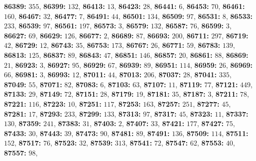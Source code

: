 \textsf{\bfseries 86389:} $355$, \textsf{\bfseries 86399:} $132$, \textsf{\bfseries 86413:} $13$, \textsf{\bfseries 86423:} $28$, \textsf{\bfseries 86441:} $6$, \textsf{\bfseries 86453:} $70$, \textsf{\bfseries 86461:} $160$, \textsf{\bfseries 86467:} $32$, \textsf{\bfseries 86477:} $7$, \textsf{\bfseries 86491:} $44$, \textsf{\bfseries 86501:} $134$, \textsf{\bfseries 86509:} $97$, \textsf{\bfseries 86531:} $8$, \textsf{\bfseries 86533:} $233$, \textsf{\bfseries 86539:} $97$, \textsf{\bfseries 86561:} $197$, \textsf{\bfseries 86573:} $3$, \textsf{\bfseries 86579:} $132$, \textsf{\bfseries 86587:} $76$, \textsf{\bfseries 86599:} $3$, \textsf{\bfseries 86627:} $69$, \textsf{\bfseries 86629:} $126$, \textsf{\bfseries 86677:} $2$, \textsf{\bfseries 86689:} $87$, \textsf{\bfseries 86693:} $200$, \textsf{\bfseries 86711:} $297$, \textsf{\bfseries 86719:} $42$, \textsf{\bfseries 86729:} $12$, \textsf{\bfseries 86743:} $35$, \textsf{\bfseries 86753:} $173$, \textsf{\bfseries 86767:} $26$, \textsf{\bfseries 86771:} $59$, \textsf{\bfseries 86783:} $139$, \textsf{\bfseries 86813:} $125$, \textsf{\bfseries 86837:} $89$, \textsf{\bfseries 86843:} $47$, \textsf{\bfseries 86851:} $146$, \textsf{\bfseries 86857:} $20$, \textsf{\bfseries 86861:} $88$, \textsf{\bfseries 86869:} $21$, \textsf{\bfseries 86923:} $3$, \textsf{\bfseries 86927:} $95$, \textsf{\bfseries 86929:} $67$, \textsf{\bfseries 86939:} $89$, \textsf{\bfseries 86951:} $114$, \textsf{\bfseries 86959:} $26$, \textsf{\bfseries 86969:} $66$, \textsf{\bfseries 86981:} $3$, \textsf{\bfseries 86993:} $12$, \textsf{\bfseries 87011:} $44$, \textsf{\bfseries 87013:} $206$, \textsf{\bfseries 87037:} $28$, \textsf{\bfseries 87041:} $335$, \textsf{\bfseries 87049:} $55$, \textsf{\bfseries 87071:} $82$, \textsf{\bfseries 87083:} $6$, \textsf{\bfseries 87103:} $63$, \textsf{\bfseries 87107:} $11$, \textsf{\bfseries 87119:} $77$, \textsf{\bfseries 87121:} $449$, \textsf{\bfseries 87133:} $29$, \textsf{\bfseries 87149:} $72$, \textsf{\bfseries 87151:} $28$, \textsf{\bfseries 87179:} $19$, \textsf{\bfseries 87181:} $35$, \textsf{\bfseries 87187:} $3$, \textsf{\bfseries 87211:} $78$, \textsf{\bfseries 87221:} $116$, \textsf{\bfseries 87223:} $10$, \textsf{\bfseries 87251:} $117$, \textsf{\bfseries 87253:} $163$, \textsf{\bfseries 87257:} $251$, \textsf{\bfseries 87277:} $45$, \textsf{\bfseries 87281:} $17$, \textsf{\bfseries 87293:} $233$, \textsf{\bfseries 87299:} $133$, \textsf{\bfseries 87313:} $97$, \textsf{\bfseries 87317:} $45$, \textsf{\bfseries 87323:} $11$, \textsf{\bfseries 87337:} $130$, \textsf{\bfseries 87359:} $241$, \textsf{\bfseries 87383:} $31$, \textsf{\bfseries 87403:} $2$, \textsf{\bfseries 87407:} $33$, \textsf{\bfseries 87421:} $177$, \textsf{\bfseries 87427:} $75$, \textsf{\bfseries 87433:} $30$, \textsf{\bfseries 87443:} $39$, \textsf{\bfseries 87473:} $90$, \textsf{\bfseries 87481:} $89$, \textsf{\bfseries 87491:} $136$, \textsf{\bfseries 87509:} $114$, \textsf{\bfseries 87511:} $152$, \textsf{\bfseries 87517:} $76$, \textsf{\bfseries 87523:} $32$, \textsf{\bfseries 87539:} $313$, \textsf{\bfseries 87541:} $72$, \textsf{\bfseries 87547:} $62$, \textsf{\bfseries 87553:} $40$, \textsf{\bfseries 87557:} $98$, 
